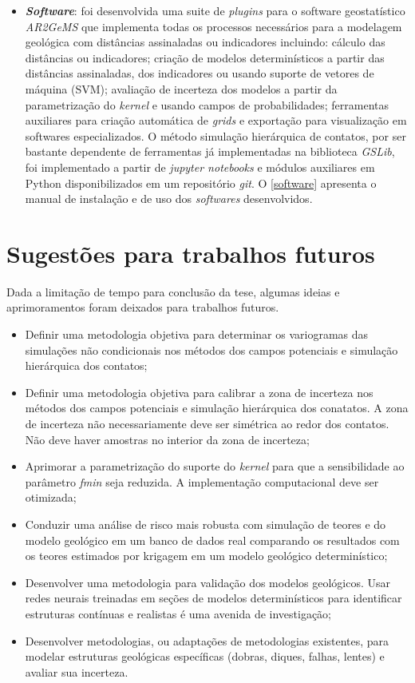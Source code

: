\begin{itemize}
    \item \textbf{\textit{Software}}: foi desenvolvida uma suite de \textit{plugins} para o software geostatístico \textit{AR2GeMS} que implementa todas os processos necessários para a modelagem geológica com distâncias assinaladas ou indicadores incluindo: cálculo das distâncias ou indicadores; criação de modelos determinísticos a partir das distâncias assinaladas, dos indicadores ou usando suporte de vetores de máquina (SVM); avaliação de incerteza dos modelos a partir da parametrização do \textit{kernel} e usando campos de probabilidades; ferramentas auxiliares para criação automática de \textit{grids} e exportação para visualização em softwares especializados. O método simulação hierárquica de contatos, por ser bastante dependente de ferramentas já implementadas na biblioteca \textit{GSLib}, foi implementado a partir de \textit{jupyter notebooks} e módulos auxiliares em Python disponibilizados em um repositório \textit{git}. O \autoref{software} apresenta o manual de instalação e de uso dos \textit{softwares} desenvolvidos.
    \end{itemize}

\section{Sugestões para trabalhos futuros}

Dada a limitação de tempo para conclusão da tese, algumas ideias e aprimoramentos foram deixados para trabalhos futuros. 

 \begin{itemize}
    \item Definir uma metodologia objetiva para determinar os variogramas das simulações não condicionais nos métodos dos campos potenciais e simulação hierárquica dos contatos; 
    \item Definir uma metodologia objetiva para calibrar a zona de incerteza nos métodos dos campos potenciais e simulação hierárquica dos conatatos. A zona de incerteza não necessariamente deve ser simétrica ao redor dos contatos. Não deve haver amostras no interior da zona de incerteza;
    \item Aprimorar a parametrização do suporte do \textit{kernel} para que a sensibilidade ao parâmetro \textit{fmin} seja reduzida. A implementação computacional deve ser otimizada;
    \item Conduzir uma análise de risco mais robusta com simulação de teores e do modelo geológico em um banco de dados real comparando os resultados com os teores estimados por krigagem em um modelo geológico determinístico; 
    \item Desenvolver uma metodologia para validação dos modelos geológicos. Usar redes neurais treinadas em seções de modelos determinísticos para identificar estruturas contínuas e realistas é uma avenida de investigação;
    \item Desenvolver metodologias, ou adaptações de metodologias existentes, para modelar estruturas geológicas específicas (dobras, diques, falhas, lentes) e avaliar sua incerteza.
 \end{itemize}